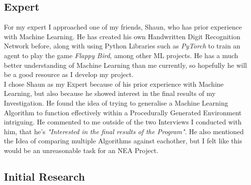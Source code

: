 \begin{flushleft}
        \subsection{Expert}
            \vspace{0.2cm}
            For my expert I approached one of my friends, Shaun, who has prior experience with Machine Learning. He has
            created his own Handwritten Digit Recognition Network before, along with using Python Libraries such as 
            \textit{PyTorch} to train an agent to play the game \textit{Flappy Bird}, among other ML projects. He has 
            a much better understanding of Machine Learning than me currently, so hopefully he will be a good resource 
            as I develop my project. \\
            \vspace{0.2cm}    
            I chose Shaun as my Expert because of his prior experience with Machine Learning, but also because he showed interest
            in the final results of my Investigation. He found the idea of trying to generalise a Machine Learning Algorithm
            to function effectively within a Procedurally Generated Environment intriguing. He commented to me outside of the
            two Interviews I conducted with him, that he's \textit{"Interested in the final results of the Program"}. He also
            mentioned the Idea of comparing multiple Algorithms against eachother, but I felt like this would be an unreasonable
            task for an NEA Project. \\
            \vspace{0.2cm}    
        \subsection{Initial Research}

\end{flushleft}
